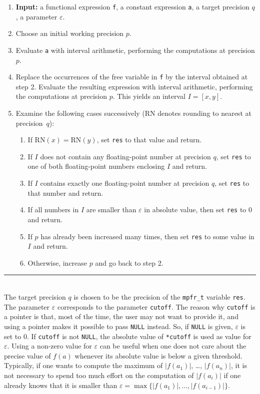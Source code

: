 \documentclass[a4paper]{article}
\begin{document}
\begin{enumerate}
\item[~]\textbf {Input:} a functional expression \verb|f|, a constant expression \verb|a|, a target precision $q$, a parameter $\varepsilon$.
\item Choose an initial working precision $p$.
\item Evaluate \verb|a| with interval arithmetic, performing the computations at precision $p$.
\item Replace the occurrences of the free variable in \verb|f| by the interval obtained at step 2. Evaluate the resulting expression with interval arithmetic, performing the computations at precision $p$. This yields an interval $I = [x,y]$.
\item Examine the following cases successively ($\mathrm{RN}$ denotes rounding to nearest at precision~$q$):
  \begin{enumerate}
  \item If $\mathrm{RN}(x) = \mathrm{RN}(y)$, set \verb|res| to that value and return.
  \item If $I$ does not contain any floating-point number at precision $q$, set \verb|res| to one of both floating-point numbers enclosing $I$ and return.
  \item If $I$ contains exactly one floating-point number at precision $q$, set \verb|res| to that number and return.
  \item If all numbers in $I$ are smaller than $\varepsilon$ in absolute value, then set \verb|res| to $0$ and return.
  \item If $p$ has already been increased many times, then set \verb|res| to some value in $I$ and return.
  \item Otherwise, increase $p$ and go back to step 2.
  \end{enumerate}
\end{enumerate}
\vspace{-0.2cm}
\rule{\textwidth}{0.5px}\\[0.7cm]
The target precision $q$ is chosen to be the precision of the \verb|mpfr_t| variable \verb|res|. The parameter $\varepsilon$ corresponds to the parameter \verb|cutoff|. The reason why \verb|cutoff| is a pointer is that, most of the time, the user may not want to provide it, and using a pointer makes it possible to pass \verb|NULL| instead. So, if \verb|NULL| is given, $\varepsilon$ is set to $0$. If \verb|cutoff| is not \verb|NULL|, the absolute value of \verb|*cutoff| is used as value for $\varepsilon$. Using a non-zero value for $\varepsilon$ can be useful when one does not care about the precise value of $f(a)$ whenever its absolute value is below a given threshold. Typically, if one wants to compute the maximum of $|f(a_1)|$, \dots, $|f(a_n)|$, it is not necessary to spend too much effort on the computation of $|f(a_i)|$ if one already knows that it is smaller than $\varepsilon = \max \{|f(a_1)|,\dots,|f(a_{i-1})|\}$.
\end{document}
